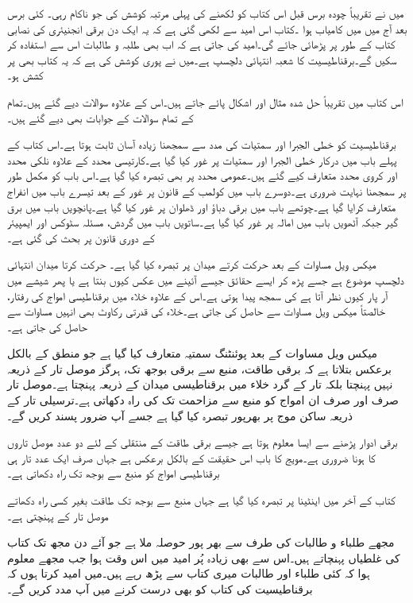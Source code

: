 میں نے تقریباً چودہ برس قبل اس کتاب کو لکھنے کی پہلی مرتبہ کوشش کی جو ناکام رہی۔ کئی برس  بعد آج میں  میں کامیاب ہوا ۔کتاب اس امید سے لکھی گئی ہے کہ یہ ایک دن برقی انجنیئری کی نصابی کتاب کے طور پر پڑھائی جائے گی۔امید کی جاتی ہے کہ اب بھی طلبہ و طالبات اس سے استفادہ کر سکیں گے۔برقناطیسیت کا شعبہ انتہائی دلچسپ ہے۔میں نے پوری کوشش کی ہے کہ یہ کتاب بھی پر کشش ہو۔


اس کتاب میں تقریباً  حل شدہ مثال اور  اشکال پائے جاتے ہیں۔اس کے علاوہ  سوالات دیے گئے ہیں۔تمام کے تمام سوالات کے جوابات بھی دیے گئے ہیں۔

برقناطیسیت کو خطی الجبرا اور سمتیات کی مدد سے سمجھنا زیادہ آسان ثابت ہوتا ہے۔اس کتاب کے پہلے باب میں درکار خطی الجبرا اور سمتیات پر غور کیا گیا ہے۔کارتیسی محدد کے علاوہ نلکی محدد اور کروی محدد متعارف کیے گئے ہیں۔عمومی محدد پر بھی تبصرہ کیا گیا ہے۔اس باب کو مکمل طور پر سمجھنا نہایت ضروری ہے۔دوسرے باب میں کولمب کے قانون پر غور کے بعد تیسرے باب میں انفراج متعارف کرایا گیا ہے۔چوتھے باب میں برقی دباؤ اور ڈھلوان پر غور کیا گیا ہے۔پانچویں باب میں برق گیر جبکہ آٹھویں باب میں امالہ پر غور کیا گیا ہے۔ساتویں باب میں گردش، مسئلہ سٹوکس اور ایمپیئر کے دوری قانون پر بحث کی گئی ہے۔ 

میکس ویل مساوات کے بعد حرکت کرتے میدان پر تبصرہ کیا گیا ہے۔ حرکت کرتا میدان انتہائی دلچسپ موضوع ہے جسے پڑھ کر ایسے حقائق جیسے  آئینے میں عکس کیوں بنتا ہے یا پھر شیشے میں آر پار کیوں نظر آتا ہے کی سمجھ پیدا ہوتی ہے۔اس کے علاوہ  خلاء میں برقناطیسی امواج کی رفتار، خالصتاً میکس ویل مساوات سے حاصل کی جاتی ہے۔خلاء کی قدرتی رکاوٹ بھی انہیں مساوات سے حاصل کی جاتی ہے۔

میکس ویل مساوات کے بعد پوئنٹنگ سمتیہ متعارف کیا گیا ہے جو منطق کے بالکل برعکس بتلاتا ہے کہ برقی طاقت، منبع سے برقی بوجھ تک، ہرگز موصل تار کے ذریعہ نہیں پہنچتا بلکہ تار کے گرد خلاء میں برقناطیسی میدان کے ذریعہ پہنچتا ہے۔موصل تار صرف اور صرف ان امواج کو منبع سے مزاحمت تک کی راہ دکھاتی ہے۔ترسیلی تار کے ذریعہ ساکن موج پر بھرپور تبصرہ کیا گیا ہے جسے آپ ضرور پسند کریں گے۔

برقی ادوار پڑھنے سے ایسا معلوم ہوتا ہے جیسے برقی طاقت کے منتقلی کے لئے دو عدد موصل تاروں کا ہونا ضروری ہے۔مویج کا باب اس حقیقت کے بالکل برعکس ہے جہاں صرف ایک عدد تار  ہی برقناطیسی امواج کو منبع سے بوجھ تک راہ دکھاتی ہے۔

کتاب کے آخر میں اینٹینا پر تبصرہ کیا گیا ہے جہاں منبع سے بوجھ تک طاقت بغیر کسی راہ دکھاتے موصل تار کے پہنچتی ہے۔

مجھے طلباء و طالبات کی طرف سے بھر پور حوصلہ ملا ہے جو آئے دن مجھ تک کتاب کی غلطیاں پہنچاتے ہیں۔اس سے بھی زیادہ پُر امید میں اس وقت ہوا جب مجھے معلوم ہوا کہ کئی طلباء اور طالبات میری کتاب سے پڑھ رہے ہیں۔میں امید کرتا ہوں کہ برقناطیسیت  کی کتاب کو بھی درست کرنے میں آپ مدد کریں گے۔

